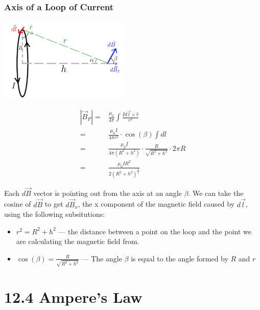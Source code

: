 \documentclass[12pt, titlepage]{article}
\begin{document}
\subsubsection*{Axis of a Loop of Current}

\begin{center}
    \includegraphics*[height=4cm]{media/axis.png}
\end{center}

\begin{align*}
    |\vec{B}_P| =& \frac{\mu_0}{4\pi} \int \frac{Id\vec{l}\times\hat{r}}{r^2} \\
    =& \frac{\mu_0I}{4 \pi r^2} \cdot \cos(\beta)\int dl \\
    =& \frac{\mu_0I}{4 \pi (R^2+h^2)} \cdot \frac{R}{\sqrt{R^2+h^2}} \cdot 2 \pi R \\
    =& \boxed{\frac{\mu_0 IR^2}{2(R^2+h^2)^\frac{3}{2}}}
\end{align*}

Each $d\vec{B}$ vector is pointing out from the axis at an angle $\beta$. We can take the cosine of $d\vec{B}$ to get $d\vec{B}_x$, the x component of the magnetic field caused by $d\vec{l}$, using the following subsitutions:
\begin{itemize}
    \item $r^2=R^2+h^2$ --- the distance between a point on the loop and the point we are calculating the magnetic field from.
    \item $\cos (\beta) = \frac{R}{\sqrt{R^2+h^2}}$ --- The angle $\beta$ is equal to the angle formed by $R$ and $r$ 
\end{itemize}

\section*{12.4 Ampere's Law}
\end{document}
